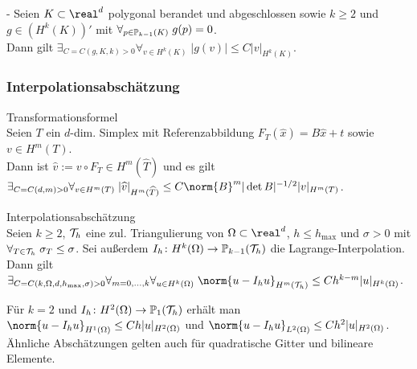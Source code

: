 \linie

\begin{Lemma}{-}
    Seien $K \subset \real^d$ polygonal berandet und abgeschlossen sowie $k \ge 2$ und
    $g \in (H^k(K))'$ mit $\forall_{p \in \mathbb{P}_{k-1}(K)}\; g(p) = 0$.\\
    Dann gilt $\exists_{C = C(g, K, k) > 0}
    \forall_{v \in H^k(K)}\; |g(v)| \le C |v|_{H^k(K)}$.
\end{Lemma}

\pagebreak

\subsubsection{%
    Interpolationsabschätzung%
}

\begin{Satz}{Transformationsformel}\\
    Seien $T$ ein $d$-dim. Simplex mit Referenzabbildung $F_T(\widehat{x}) = B\widehat{x} + t$
    sowie $v \in H^m(T)$.\\
    Dann ist $\widehat{v} := v \circ F_T \in H^m(\widehat{T})$ und es gilt\\
    $\exists_{C = C(d, m) > 0} \forall_{v \in H^m(T)}\;
    |\widehat{v}|_{H^m(\widehat{T})} \le C \norm{B}^m |\det B|^{-1/2} |v|_{H^m(T)}$.
\end{Satz}

\linie

\begin{Satz}{Interpolationsabschätzung}\\
    Seien $k \ge 2$,
    $\mathcal{T}_h$ eine zul. Triangulierung von $\Omega \subset \real^d$,
    $h \le h_{\max}$ und
    $\sigma > 0$ mit $\forall_{T \in \mathcal{T}_h}\; \sigma_T \le \sigma$.
    Sei außerdem $I_h\colon H^k(\Omega) \to \mathbb{P}_{k-1}(\mathcal{T}_h)$ die Lagrange-Interpolation.\\
    Dann gilt $\exists_{C = C(k, \Omega, d, h_{\max}, \sigma) > 0}
    \forall_{m=0,\dotsc,k} \forall_{u \in H^k(\Omega)}\;
    \norm{u - I_h u}_{H^m(\T_h)} \le Ch^{k-m} |u|_{H^k(\Omega)}$.
\end{Satz}

\begin{Bem}
    Für $k = 2$ und $I_h\colon H^2(\Omega) \to \mathbb{P}_1(\mathcal{T}_h)$ erhält man\\
    $\norm{u - I_h u}_{H^1(\Omega)} \le Ch |u|_{H^2(\Omega)}$ und
    $\norm{u - I_h u}_{L^2(\Omega)} \le Ch^2 |u|_{H^2(\Omega)}$.\\
    Ähnliche Abschätzungen gelten auch für quadratische Gitter und bilineare Elemente.
\end{Bem}

